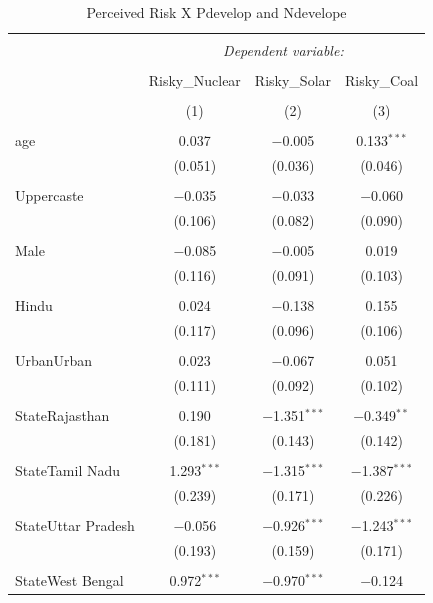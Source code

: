 \documentclass[
]{article}
\begin{document}
\begin{table}[!htbp] \centering 
  \caption{Perceived Risk X Pdevelop and Ndevelope} 
  \label{} 
\begin{tabular}{@{\extracolsep{5pt}}lccc} 
\\[-1.8ex]\hline 
\hline \\[-1.8ex] 
 & \multicolumn{3}{c}{\textit{Dependent variable:}} \\ 
\cline{2-4} 
\\[-1.8ex] & Risky\_Nuclear & Risky\_Solar & Risky\_Coal \\ 
\\[-1.8ex] & (1) & (2) & (3)\\ 
\hline \\[-1.8ex] 
 age & 0.037 & $-$0.005 & 0.133$^{***}$ \\ 
  & (0.051) & (0.036) & (0.046) \\ 
  & & & \\ 
 Uppercaste & $-$0.035 & $-$0.033 & $-$0.060 \\ 
  & (0.106) & (0.082) & (0.090) \\ 
  & & & \\ 
 Male & $-$0.085 & $-$0.005 & 0.019 \\ 
  & (0.116) & (0.091) & (0.103) \\ 
  & & & \\ 
 Hindu & 0.024 & $-$0.138 & 0.155 \\ 
  & (0.117) & (0.096) & (0.106) \\ 
  & & & \\ 
 UrbanUrban & 0.023 & $-$0.067 & 0.051 \\ 
  & (0.111) & (0.092) & (0.102) \\ 
  & & & \\ 
 StateRajasthan & 0.190 & $-$1.351$^{***}$ & $-$0.349$^{**}$ \\ 
  & (0.181) & (0.143) & (0.142) \\ 
  & & & \\ 
 StateTamil Nadu & 1.293$^{***}$ & $-$1.315$^{***}$ & $-$1.387$^{***}$ \\ 
  & (0.239) & (0.171) & (0.226) \\ 
  & & & \\ 
 StateUttar Pradesh & $-$0.056 & $-$0.926$^{***}$ & $-$1.243$^{***}$ \\ 
  & (0.193) & (0.159) & (0.171) \\ 
  & & & \\ 
 StateWest Bengal & 0.972$^{***}$ & $-$0.970$^{***}$ & $-$0.124 \\ 

\end{tabular}
\end{table}
\end{document}

